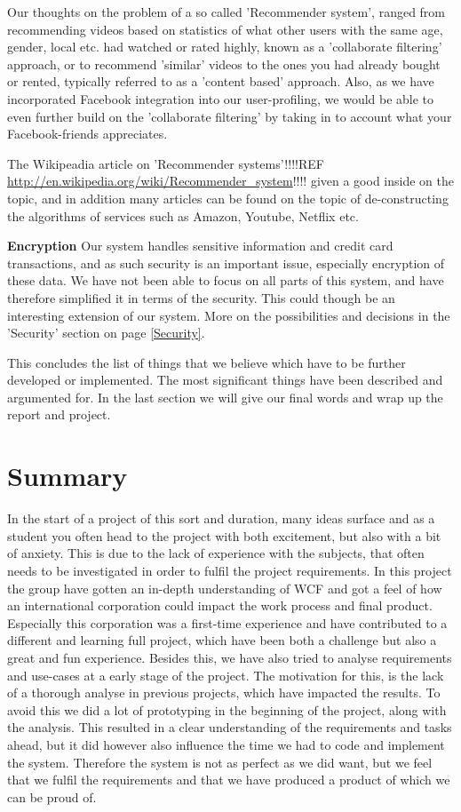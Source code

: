 Our thoughts on the problem of a so called 'Recommender system', ranged from recommending videos based on statistics of what other users with the same age, gender, local etc. had watched or rated highly, known as a 'collaborate filtering' approach, or to recommend 'similar' videos to the ones you had already bought or rented, typically referred to as a 'content based' approach. Also, as we have incorporated Facebook integration into our user-profiling, we would be able to even further build on the 'collaborate filtering' by taking in to account what your Facebook-friends appreciates. \

The Wikipeadia article on 'Recommender systems'!!!!REF \url{http://en.wikipedia.org/wiki/Recommender_system}!!!! given a good inside on the topic, and in addition many articles can be found on the topic of de-constructing the algorithms of services such as Amazon, Youtube, Netflix etc. \

\textbf{Encryption}
Our system handles sensitive information and credit card transactions, and as such security is an important issue, especially encryption of these data. We have not been able to focus on all parts of this system, and have therefore simplified it in terms of the security. This could though be an interesting extension of our system. More on the possibilities and decisions in the 'Security' section on page \ref{Security}. \

This concludes the list of things that we believe which have to be further developed or implemented. The most significant things have been described and argumented for. In the last section we will give our final words and wrap up the report and project.

\newpage
\section{Summary}
In the start of a project of this sort and duration, many ideas surface and as a student you often head to the project with both excitement, but also with a bit of anxiety. This is due to the lack of experience with the subjects, that often needs to be investigated in order to fulfil the project requirements. In this project the group have gotten an in-depth understanding of WCF and got a feel of how an international corporation could impact the work process and final product. Especially this corporation was a first-time experience and have contributed to a different and learning full project, which have been both a challenge but also a great and fun experience. 
Besides this, we have also tried to analyse requirements and use-cases at a early stage of the project. The motivation for this, is the lack of a thorough analyse in previous projects, which have impacted the results. To avoid this we did a lot of prototyping in the beginning of the project, along with the analysis. This resulted in a clear understanding of the requirements and tasks ahead, but it did however also influence the time we had to code and implement the system. Therefore the system is not as perfect as we did want, but we feel that we fulfil the requirements and that we have produced a product of which we can be proud of.




 